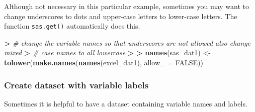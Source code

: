 \documentclass[
]{book}
\newenvironment{Shaded}{\begin{snugshade}}{\end{snugshade}}
\newcommand{\CommentTok}[1]{\textcolor[rgb]{0.56,0.35,0.01}{\textit{#1}}}
\newcommand{\DataTypeTok}[1]{\textcolor[rgb]{0.13,0.29,0.53}{#1}}
\newcommand{\ErrorTok}[1]{\textcolor[rgb]{0.64,0.00,0.00}{\textbf{#1}}}
\newcommand{\KeywordTok}[1]{\textcolor[rgb]{0.13,0.29,0.53}{\textbf{#1}}}
\newcommand{\NormalTok}[1]{#1}
\newcommand{\OperatorTok}[1]{\textcolor[rgb]{0.81,0.36,0.00}{\textbf{#1}}}
\newcommand{\OtherTok}[1]{\textcolor[rgb]{0.56,0.35,0.01}{#1}}
\newcommand{\StringTok}[1]{\textcolor[rgb]{0.31,0.60,0.02}{#1}}
\begin{document}
Although not necessary in this particular example, sometimes you may want to change underscores to dots and upper-case letters to lower-case letters. The function \texttt{sas.get()} automatically does this.

\begin{Shaded}
\begin{Highlighting}[]
\OperatorTok{>}\StringTok{ }\CommentTok{# change the variable names so that underscores are not allowed also change mixed}
\ErrorTok{>}\StringTok{ }\CommentTok{# case names to all lowercase}
\ErrorTok{>}\StringTok{ }
\ErrorTok{>}\StringTok{ }\KeywordTok{names}\NormalTok{(sas_dat1) <-}\StringTok{ }\KeywordTok{tolower}\NormalTok{(}\KeywordTok{make.names}\NormalTok{(}\KeywordTok{names}\NormalTok{(excel_dat1), }\DataTypeTok{allow_ =} \OtherTok{FALSE}\NormalTok{))}
\end{Highlighting}
\end{Shaded}

\hypertarget{vlabels}{%
\subsubsection{Create dataset with variable labels}\label{vlabels}}

Sometimes it is helpful to have a dataset containing variable names and labels.
\end{document}
